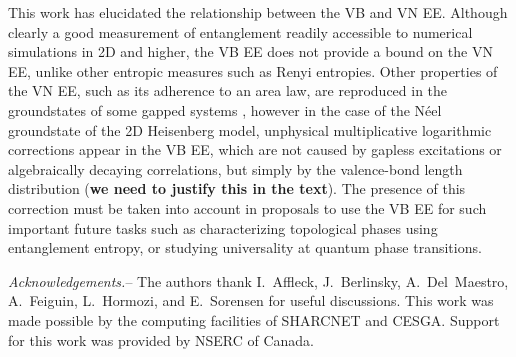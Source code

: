 \documentclass[prl,aps,twocolumn,floatfix,amsmath,amssymb,superscriptaddress,tightenlines]{revtex4}
\begin{document}
This work has elucidated the relationship between the VB and VN EE.
Although clearly a good measurement of entanglement readily accessible to
numerical simulations in 2D and higher, the VB EE does not provide a bound
on the VN EE, unlike other entropic measures such as Renyi entropies.
Other properties of the VN EE, such as its adherence to an area law, are
reproduced in the groundstates of some gapped systems \cite{Alet,Chh},
however in the case of the N\'eel groundstate of the 2D Heisenberg model,
unphysical multiplicative logarithmic corrections appear in the VB EE,
which are not caused by gapless excitations or algebraically decaying
correlations, but simply by the valence-bond length distribution ({\bf we
need to justify this in the text}).  The presence of this correction must
be taken into account in proposals to use the VB EE for such important
future tasks such as characterizing topological phases using entanglement
entropy, or studying universality at quantum phase transitions.

{\it Acknowledgements.}-- The authors thank I.~Affleck, J.~Berlinsky,
A.~Del~Maestro, A.~Feiguin, L.~Hormozi, and E.~Sorensen for useful
discussions.  This work was made possible by the computing facilities of
SHARCNET and CESGA.  Support for this work was provided by NSERC of
Canada.


\end{document}
